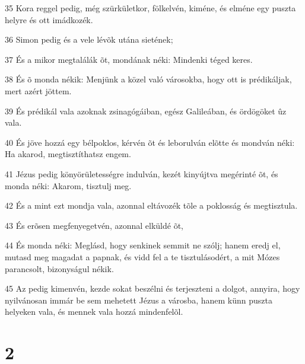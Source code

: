 \par 35 Kora reggel pedig, még szürkületkor, fölkelvén, kiméne, és elméne egy puszta helyre és ott imádkozék.
\par 36 Simon pedig és a vele lévõk utána sietének;
\par 37 És a mikor megtalálák õt, mondának néki: Mindenki téged keres.
\par 38 És õ monda nékik: Menjünk a közel való városokba, hogy ott is prédikáljak, mert azért jöttem.
\par 39 És prédikál vala azoknak zsinagógáiban, egész Galileában, és ördögöket ûz vala.
\par 40 És jöve hozzá egy bélpoklos, kérvén õt és leborulván elõtte és mondván néki: Ha akarod, megtisztíthatsz engem.
\par 41 Jézus pedig könyörületességre indulván, kezét kinyújtva megérinté õt, és monda néki: Akarom, tisztulj meg.
\par 42 És a mint ezt mondja vala, azonnal eltávozék tõle a poklosság és megtisztula.
\par 43 És erõsen megfenyegetvén, azonnal elküldé õt,
\par 44 És monda néki: Meglásd, hogy senkinek semmit ne szólj; hanem eredj el, mutasd meg magadat a papnak, és vidd fel a te tisztulásodért, a mit Mózes parancsolt, bizonyságul nékik.
\par 45 Az pedig kimenvén, kezde sokat beszélni és terjeszteni a dolgot, annyira, hogy nyilvánosan immár be sem mehetett Jézus a városba, hanem künn puszta helyeken vala, és mennek vala hozzá mindenfelõl.

\chapter{2}

